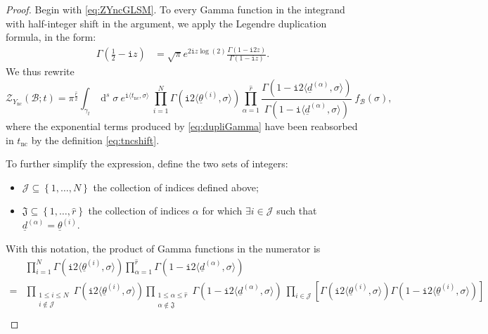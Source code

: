 \documentclass[10pt,a4paper]{amsart}
\DeclareMathOperator{\dd}{d}
\newcommand{\Br}{\mathcal{B}}
\newcommand{\Ync}{Y_{\mathrm{nc}}}
\newcommand{\ii}{\mathtt{i}}
\newcommand{\mz}{\mathcal{Z}}
\newcommand{\tnc}{t_{\mathrm{nc}}}
\begin{document}
\begin{proof}
Begin with \eqref{eq:ZYncGLSM}. To every Gamma function in the integrand with half-integer shift in the argument, we apply the Legendre duplication formula, in the form:
\begin{align}\label{eq:dupliGamma}
	\Gamma \left( \frac{1}{2}- \ii z \right) &= \sqrt{\pi} e^{2 \ii z \log (2) } \frac{  \Gamma \left( 1 - \ii 2 z \right) }{   \Gamma \left( 1 - \ii z  \right)} .
\end{align}
We thus rewrite 
\begin{equation}
\label{eq:ZYncduplic}
	\mz_{\Ync} \left( \Br; t \right) = \pi^{\frac{\hat{r}}{2}} \int_{\gamma_t} \dd^s \sigma~e^{\ii \langle \tnc, \sigma\rangle } ~\prod_{i=1}^{N} \Gamma \left( \ii 2 \langle \underline{\theta}^{(i)}, \sigma \rangle \right) \prod_{\alpha=1}^{\hat{r}} \frac{\Gamma \left( 1 - \ii 2 \langle\underline{d}^{(\alpha)}, \sigma \rangle \right) }{\Gamma \left( 1 - \ii \langle\underline{d}^{(\alpha)}, \sigma \rangle \right)}   ~f_{\Br} (\sigma) ,
\end{equation}
where the exponential terms produced by \eqref{eq:dupliGamma} have been reabsorbed in $\tnc$ by the definition \eqref{eq:tncshift}.\par
To further simplify the expression, define the two sets of integers:
\begin{itemize}
\item $\mathcal{J} \subseteq \left\{ 1, \dots, N \right\}$ the collection of indices defined above;
\item $\mathfrak{J} \subseteq \left\{ 1, \dots, \hat{r} \right\}$ the collection of indices $\alpha$ for which $\exists i \in \mathcal{J}$ such that $\underline{d}^{(\alpha)} = \underline{\theta}^{(i)}$.
\end{itemize}
With this notation, the product of Gamma functions in the numerator is 
\begin{align*}
	&\prod_{i=1}^{N} \Gamma \left( \ii 2 \langle \underline{\theta}^{(i)}, \sigma \rangle \right) \prod_{\alpha =1}^{\hat{r}} \Gamma \left( 1 - \ii 2 \langle\underline{d}^{(\alpha)}, \sigma \rangle \right) \\
 = &\prod_{\substack{ 1 \le i \le N \\ i \notin \mathcal{J} }} \Gamma \left( \ii 2 \langle \underline{\theta}^{(i)}, \sigma \rangle \right) \prod_{\substack{ 1 \le \alpha \le \hat{r} \\ \alpha \notin \mathfrak{J}} } \Gamma \left( 1 - \ii 2 \langle\underline{d}^{(\alpha)}, \sigma \rangle \right) ~ \prod_{i \in \mathcal{J} } \left[ \Gamma \left( \ii 2 \langle \underline{\theta}^{(i)}, \sigma \rangle \right) \Gamma \left( 1 - \ii 2 \langle\underline{\theta}^{(i)}, \sigma \rangle \right) \right] \\

\end{align*}
\end{proof}
\end{document}
